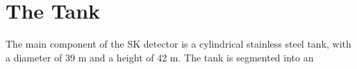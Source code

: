 \section{The Tank}
\label{sec:tank}
The main component of the SK detector is a cylindrical stainless steel tank, with a diameter of 39 m and a height of 42 m.  The tank is segmented into an 